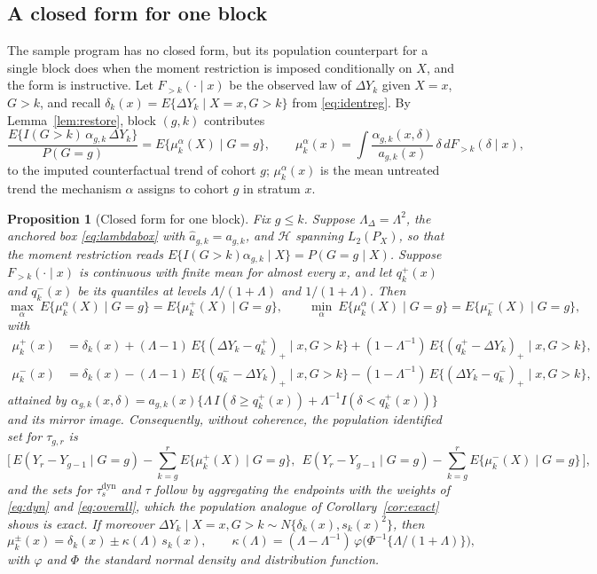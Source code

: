 \documentclass[12pt]{article}
\newtheorem{proposition}{Proposition}
\theoremstyle{remark}
\begin{document}
\subsection{A closed form for one block}
\label{sec:closed}

The sample program has no closed form, but its population counterpart for a single block
does when the moment restriction is imposed conditionally on $X$, and the form is
instructive. Let $F_{>k}(\cdot \mid x)$ be the observed law of $\Delta Y_k$ given
$X = x$, $G > k$, and recall $\delta_k(x) = E\{\Delta Y_k \mid X{=}x, G{>}k\}$ from
\eqref{eq:identreg}. By Lemma~\ref{lem:restore}, block $(g,k)$ contributes
\[
\frac{E\{I(G{>}k)\,\alpha_{g,k}\,\Delta Y_k\}}{P(G{=}g)} = E\{\mu^{\alpha}_k(X) \mid G{=}g\},
\qquad
\mu^{\alpha}_k(x) = \int \frac{\alpha_{g,k}(x,\delta)}{a_{g,k}(x)}\,\delta\, dF_{>k}(\delta \mid x),
\]
to the imputed counterfactual trend of cohort $g$; $\mu^{\alpha}_k(x)$ is the mean
untreated trend the mechanism $\alpha$ assigns to cohort $g$ in stratum $x$.

\begin{proposition}[Closed form for one block]
\label{prop:closed}
Fix $g \le k$. Suppose $\Lambda_\Delta = \Lambda^2$, the anchored box \eqref{eq:lambdabox}
with $\widehat a_{g,k} = a_{g,k}$, and $\mathcal{H}$ spanning $L_2(P_X)$, so that the
moment restriction reads $E\{I(G{>}k)\alpha_{g,k} \mid X\} = P(G{=}g \mid X)$. Suppose
$F_{>k}(\cdot \mid x)$ is continuous with finite mean for almost every $x$, and let
$q^{+}_k(x)$ and $q^{-}_k(x)$ be its quantiles at levels $\Lambda/(1{+}\Lambda)$ and
$1/(1{+}\Lambda)$. Then
\[
\max_{\alpha}\ E\{\mu^{\alpha}_k(X) \mid G{=}g\} = E\{\mu^{+}_k(X) \mid G{=}g\},
\qquad
\min_{\alpha}\ E\{\mu^{\alpha}_k(X) \mid G{=}g\} = E\{\mu^{-}_k(X) \mid G{=}g\},
\]
with
\begin{align*}
\mu^{+}_k(x) &= \delta_k(x) + (\Lambda{-}1)\,E\{(\Delta Y_k - q^{+}_k)_+ \mid x, G{>}k\}
 + (1{-}\Lambda^{-1})\,E\{(q^{+}_k - \Delta Y_k)_+ \mid x, G{>}k\},\\
\mu^{-}_k(x) &= \delta_k(x) - (\Lambda{-}1)\,E\{(q^{-}_k - \Delta Y_k)_+ \mid x, G{>}k\}
 - (1{-}\Lambda^{-1})\,E\{(\Delta Y_k - q^{-}_k)_+ \mid x, G{>}k\},
\end{align*}
attained by $\alpha_{g,k}(x,\delta) = a_{g,k}(x)\{\Lambda\, I(\delta \ge q^{+}_k(x)) +
\Lambda^{-1} I(\delta < q^{+}_k(x))\}$ and its mirror image. Consequently, without
coherence, the population identified set for $\tau_{g,r}$ is
\[
\Big[\, E(Y_r - Y_{g-1} \mid G{=}g) - \sum_{k=g}^{r} E\{\mu^{+}_k(X) \mid G{=}g\},\ \
        E(Y_r - Y_{g-1} \mid G{=}g) - \sum_{k=g}^{r} E\{\mu^{-}_k(X) \mid G{=}g\} \,\Big],
\]
and the sets for $\tau^{\mathrm{dyn}}_s$ and $\tau$ follow by aggregating the endpoints
with the weights of \eqref{eq:dyn} and \eqref{eq:overall}, which the population analogue
of Corollary~\ref{cor:exact} shows is exact. If moreover $\Delta Y_k \mid X{=}x, G{>}k \sim N\{\delta_k(x), s_k(x)^2\}$,
then
\[
\mu^{\pm}_k(x) = \delta_k(x) \pm \kappa(\Lambda)\, s_k(x),
\qquad
\kappa(\Lambda) = (\Lambda - \Lambda^{-1})\,
 \varphi\!\big(\Phi^{-1}\{\Lambda/(1{+}\Lambda)\}\big),
\]
with $\varphi$ and $\Phi$ the standard normal density and distribution function.
\end{proposition}
\end{document}
